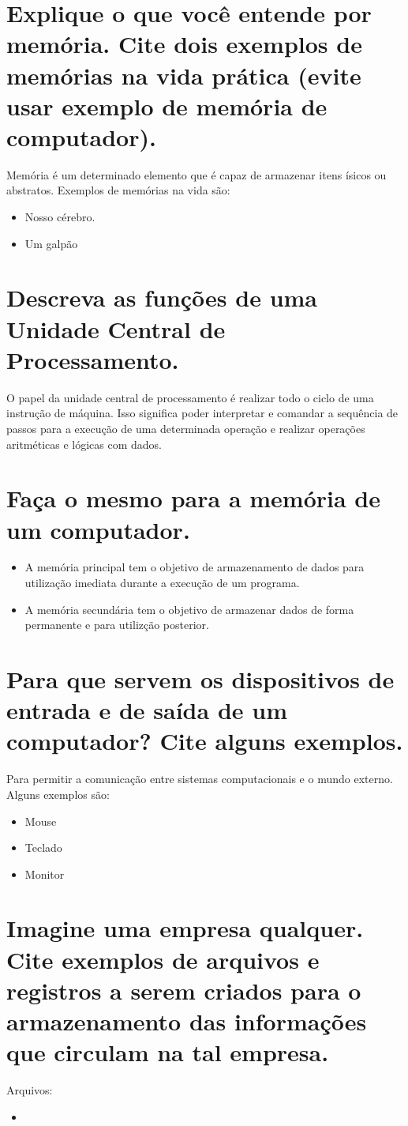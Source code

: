 \documentclass[11pt]{article}
\date{\today}
\title{}
\begin{document}
\tableofcontents


\section{Explique o que você entende por memória. Cite dois exemplos de memórias na vida prática (evite usar exemplo de memória de computador).}
\label{sec:org27e9cdb}
Memória é um determinado elemento que é capaz de armazenar itens ísicos ou
abstratos. Exemplos de memórias na vida são:
\begin{itemize}
\item Nosso cérebro.
\item Um galpão
\end{itemize}
\section{Descreva as funções de uma Unidade Central de Processamento.}
\label{sec:orgb89a338}
O papel da unidade central de processamento é realizar todo o ciclo de uma
instrução de máquina. Isso significa poder interpretar e comandar a sequência de
passos para a execução de uma determinada operação e realizar operações
aritméticas e lógicas com dados.
\section{Faça o mesmo para a memória de um computador.}
\label{sec:org76a63db}
\begin{itemize}
\item A memória principal tem o objetivo de armazenamento de dados para utilização
imediata durante a execução de um programa.
\item A memória secundária tem o objetivo de armazenar dados de forma permanente e
para utilizção posterior.
\end{itemize}
\section{Para que servem os dispositivos de entrada e de saída de um computador? Cite alguns exemplos.}
\label{sec:org4ae3ac5}
Para permitir a comunicação entre sistemas computacionais e o mundo externo.
Alguns exemplos são:
\begin{itemize}
\item Mouse
\item Teclado
\item Monitor
\end{itemize}
\section{Imagine uma empresa qualquer. Cite exemplos de arquivos e registros a serem criados para o armazenamento das informações que circulam na tal empresa.}
\label{sec:orge021cb4}
Arquivos:
\begin{itemize}
\item 
\end{itemize}
\end{document}
